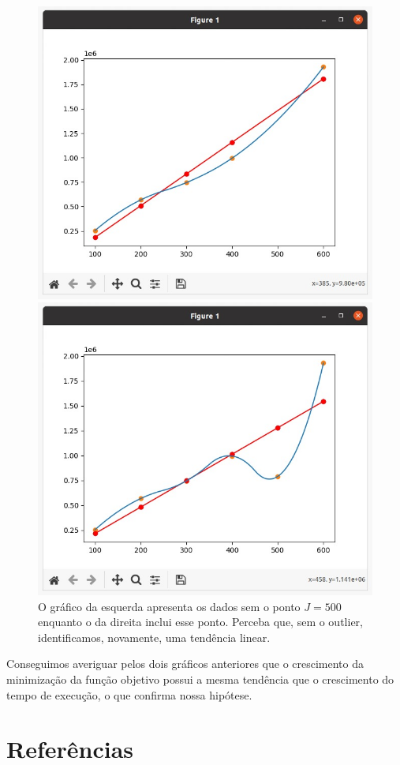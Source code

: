 \documentclass{article}
\begin{document}
\begin{figure}[!ht]
\begin{multicols}{2}

    \includegraphics[width=\linewidth]{minimizacao_sem_J=500.jpeg}\par
    \includegraphics[width=\linewidth]{minimizacao_com_J=500.jpeg}\par

\end{multicols}
\caption{O gráfico da esquerda apresenta os dados sem o ponto $J=500$ enquanto o da direita inclui esse ponto. Perceba que, sem o outlier, identificamos, novamente, uma tendência linear.}
\end{figure}

Conseguimos averiguar pelos dois gráficos anteriores que o crescimento da minimização da função objetivo possui a mesma tendência que o crescimento do tempo de execução, o que confirma nossa hipótese.

\section{Referências}



\end{document}
